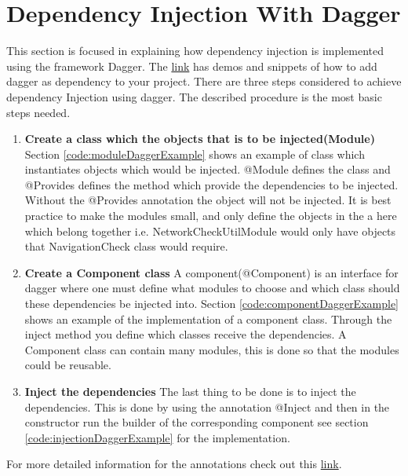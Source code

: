 \newpage
\section{Dependency Injection With Dagger}
    \label{sec:daggerDIImplementation}
    This section is focused in explaining how dependency injection is implemented
    using the framework Dagger.
    The \href{https://github.com/slidenerd/Vivz_Dagger_2_Demo}{link} has demos and snippets
    of how to add dagger as dependency to your project. There are three steps considered
    to achieve dependency Injection using dagger. The described procedure is the most
    basic steps needed. 
    \begin{enumerate}
        \item 
            \textbf{Create a class which the objects that is to be injected(Module)}
                Section \ref{code:moduleDaggerExample} shows an example of class which instantiates 
                objects which would be injected. @Module defines the class and @Provides
                defines the method which provide the dependencies to be injected. Without the
                @Provides annotation the object will not be injected. 
                It is best practice to make the modules small, and only define 
                the objects in the a here 
                which belong together i.e. NetworkCheckUtilModule would only have
                objects that NavigationCheck class would require.  
        \item 
            \textbf{Create a Component class}
                A component(@Component) is an interface for dagger where one  must define 
                what modules to choose and which class should these dependencies be injected into. 
                Section \ref{code:componentDaggerExample} shows an example of the implementation of a 
                component class.
                Through the inject method you define
                which classes receive the dependencies. A Component class can contain 
                many modules, this is done so that the modules could be reusable. 
        \item 
            \textbf{Inject the dependencies}
                The last thing to be done is to inject the dependencies. This is done by
                using the annotation @Inject and then in the constructor run the builder
                of the corresponding component see section \ref{code:injectionDaggerExample} for the
                implementation. 
    \end{enumerate}
    For more detailed information for the annotations check out
    this \href{http://www.vogella.com/tutorials/Dagger/article.html}
    {link}.